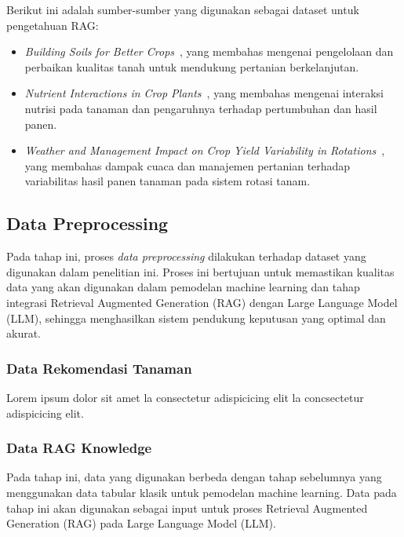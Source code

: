 \documentclass{article} %
\begin{document}
Berikut ini adalah sumber-sumber yang digunakan sebagai dataset untuk pengetahuan RAG:

\begin{itemize}
    \item \textit{Building Soils for Better Crops}~\cite{b11}, yang membahas mengenai pengelolaan dan perbaikan kualitas tanah untuk mendukung pertanian berkelanjutan.
    \item \textit{Nutrient Interactions in Crop Plants}~\cite{b12}, yang membahas mengenai interaksi nutrisi pada tanaman dan pengaruhnya terhadap pertumbuhan dan hasil panen.
    \item \textit{Weather and Management Impact on Crop Yield Variability in Rotations}~\cite{b13}, yang membahas dampak cuaca dan manajemen pertanian terhadap variabilitas hasil panen tanaman pada sistem rotasi tanam.
\end{itemize}

\subsection{Data Preprocessing}
Pada tahap ini, proses \textit{data preprocessing} dilakukan terhadap dataset yang digunakan dalam penelitian ini. Proses ini bertujuan untuk memastikan kualitas data yang akan digunakan dalam pemodelan machine learning dan tahap integrasi Retrieval Augmented Generation (RAG) dengan Large Language Model (LLM), sehingga menghasilkan sistem pendukung keputusan yang optimal dan akurat.

\subsubsection{Data Rekomendasi Tanaman}
Lorem ipsum dolor sit amet la consectetur adispicicing elit la concsectetur adispicicing elit.

\subsubsection{Data RAG Knowledge}
Pada tahap ini, data yang digunakan berbeda dengan tahap sebelumnya yang menggunakan data tabular klasik untuk pemodelan machine learning. Data pada tahap ini akan digunakan sebagai input untuk proses Retrieval Augmented Generation (RAG) pada Large Language Model (LLM).
\end{document}
